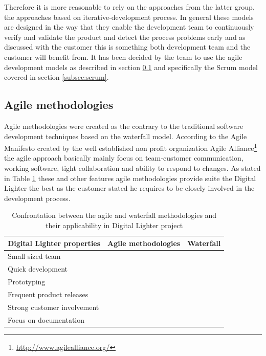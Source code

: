 Therefore it is more reasonable to rely on the approaches from the latter group, the approaches based on iterative-development process. In general these models are designed in the way that they enable the development team to continuously verify and validate the product and detect the process problems early and as discussed with the customer this is something both development team and the customer will benefit from. It has been decided by the team to use the agile development models as described in section \ref{subsec:agile_methodologies} and specifically the Scrum model covered in section \ref{subsec:scrum}.

\subsection{Agile methodologies} \label{subsec:agile_methodologies}
Agile methodologies were created as the contrary to the traditional software development techniques based on the waterfall model. According to the Agile Manifesto \cite{agileManifesto} created by the well established non profit organization Agile Alliance\footnote{\url{http://www.agilealliance.org/}} the agile approach basically mainly focus on team-customer communication, working software, tight collaboration and ability to respond to changes. As stated in Table \ref{tab:agile_vs_waterfall} these and other features agile methodologies provide suite the Digital Lighter the best as the customer stated he requires to be closely involved in the development process.

\begin{table}[htb]
	\begin{center}
	\caption{Confrontation between the agile and waterfall methodologies and their applicability in Digital Lighter project}
	\label{tab:agile_vs_waterfall}
	\def\arraystretch{1.3}
		\begin{tabularx}{0.9\textwidth}{ X c c }
		\toprule[0.5mm]
		\textbf{Digital Lighter properties} & \textbf{Agile methodologies} & \textbf{Waterfall} \\
		\midrule
		Small sized team 								& \tick  & \tick 	\\
		Quick development				 				& \tick  & \cross 	\\
		Prototyping										& \tick  & \cross 	\\
		Frequent product releases 						& \tick  & \cross 	\\
		Strong customer involvement 					& \tick  & \cross 	\\
		Focus on documentation 							& \cross & \tick  	\\
		\bottomrule[0.5mm]
		\end{tabularx}
	\end{center}
\end{table}

